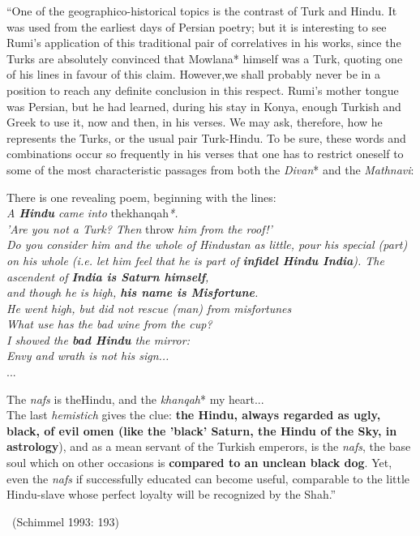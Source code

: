 \begin{myquote}
“One of the geographico-historical topics is the contrast of Turk and Hindu. It was used from the earliest days of Persian poetry; but it is interesting to see Rumi's application of this traditional pair of correlatives in his works, since the Turks are absolutely convinced that Mowlana* himself was a Turk, quoting one of his lines in favour of this claim. However,we shall probably never be in a position to reach any definite conclusion in this respect. Rumi's mother tongue was Persian, but he had learned, during his stay in Konya, enough Turkish and Greek to use it, now and then, in his verses. We may ask, therefore, how he represents the Turks, or the usual pair Turk-Hindu. To be sure, these words and combinations occur so frequently in his verses that one has to restrict oneself to some of the most characteristic passages from both the \textit{Divan}* and the \textit{Mathnavi}:
\end{myquote}

\begin{myquote}
There is one revealing poem, beginning with the lines:\\\textit{A \textbf{Hindu} came into }thekhanqah\textit{*.}\\\textit{'Are you not a Turk? Then }throw\textit{ him from the roof!'\\ Do you consider him and the whole of Hindustan as little, pour his special (part) on his whole (i.e. let him feel that he is part of \textbf{infidel Hindu India}). The ascendent of \textbf{India is Saturn himself},\\ and though he is high, \textbf{his name is Misfortune}.\\ He went high, but did not rescue (man) from misfortunes\\ What use has the bad wine from the cup?\\ I showed the \textbf{bad Hindu} the mirror:}\\\textit{Envy and wrath is not his sign...}\\...
\end{myquote}

\begin{myquote}
The \textit{nafs} is theHindu, and the \textit{khanqah}* my heart...\\ The last \textit{hemistich} gives the clue: \textbf{the Hindu, always regarded as ugly, black, of evil omen (like the 'black' Saturn, the Hindu of the Sky, in astrology}), and as a mean servant of the Turkish emperors, is the \textit{nafs}, the base soul which on other occasions is \textbf{compared to an unclean black dog}. Yet, even the \textit{nafs} if successfully educated can become useful, comparable to the little Hindu-slave whose perfect loyalty will be recognized by the Shah.” 

~\hfill (Schimmel 1993: 193)
\end{myquote}

